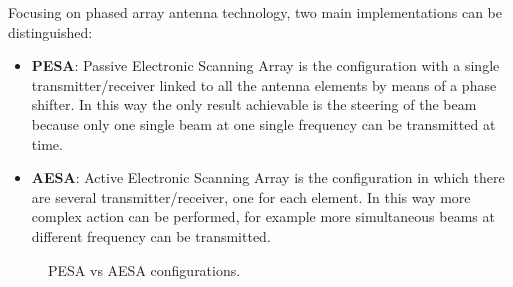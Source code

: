 Focusing on phased array antenna technology, two main implementations can be distinguished:

\begin{itemize}
     \item \textbf{PESA}: Passive Electronic Scanning Array is the configuration with a single transmitter/receiver linked to all the antenna elements by means of a phase shifter. In this way the only result achievable is the steering of the beam because only one single beam at one single frequency can be transmitted at time.

         
    \item \textbf{AESA}: Active Electronic Scanning Array is the configuration in which there are several transmitter/receiver, one for each element. In this way more complex action can be performed, for example more simultaneous beams at different frequency can be transmitted.
        
\end{itemize}



\begin{figure}
    \centering
    \qquad
    \caption{PESA vs AESA configurations.}
\end{figure}


